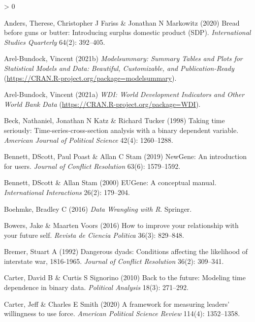 \documentclass[
  11pt,
]{article}
\newlength{\cslhangindent}
\newenvironment{CSLReferences}[2] %
 {%
  \setlength{\parindent}{0pt}
  \ifodd #1 \everypar{\setlength{\hangindent}{\cslhangindent}}\ignorespaces\fi
  \ifnum #2 > 0
  \setlength{\parskip}{#2\baselineskip}
  \fi
 }%
 {}
\begin{document}
\hypertarget{refs}{}
\begin{CSLReferences}{1}{0}
\leavevmode\hypertarget{ref-andersetal2020bbgb}{}%
Anders, Therese, Christopher J Fariss \& Jonathan N Markowitz (2020) Bread before guns or butter: Introducing surplus domestic product (SDP). \emph{International Studies Quarterly} 64(2): 392--405.

\leavevmode\hypertarget{ref-arelbundock2021m}{}%
Arel-Bundock, Vincent (2021b) \emph{Modelsummary: Summary Tables and Plots for Statistical Models and Data: Beautiful, Customizable, and Publication-Ready} (\url{https://CRAN.R-project.org/package=modelsummary}).

\leavevmode\hypertarget{ref-arelbundock2021w}{}%
Arel-Bundock, Vincent (2021a) \emph{WDI: World Development Indicators and Other World Bank Data} (\url{https://CRAN.R-project.org/package=WDI}).

\leavevmode\hypertarget{ref-becketal1998tts}{}%
Beck, Nathaniel, Jonathan N Katz \& Richard Tucker (1998) Taking time seriously: Time-series-cross-section analysis with a binary dependent variable. \emph{American Journal of Political Science} 42(4): 1260--1288.

\leavevmode\hypertarget{ref-bennettetal2019n}{}%
Bennett, DScott, Paul Poast \& Allan C Stam (2019) NewGene: An introduction for users. \emph{Journal of Conflict Resolution} 63(6): 1579--1592.

\leavevmode\hypertarget{ref-bennettstam2000e}{}%
Bennett, DScott \& Allan Stam (2000) EUGene: A conceptual manual. \emph{International Interactions} 26(2): 179--204.

\leavevmode\hypertarget{ref-boehmke2016dwr}{}%
Boehmke, Bradley C (2016) \emph{Data Wrangling with {R}}. Springer.

\leavevmode\hypertarget{ref-bowersvoors2016hiyr}{}%
Bowers, Jake \& Maarten Voors (2016) How to improve your relationship with your future self. \emph{Revista de Ciencia Politica} 36(3): 829--848.

\leavevmode\hypertarget{ref-bremer1992ddc}{}%
Bremer, Stuart A (1992) Dangerous dyads: Conditions affecting the likelihood of interstate war, 1816-1965. \emph{Journal of Conflict Resolution} 36(2): 309--341.

\leavevmode\hypertarget{ref-cartersignorino2010bf}{}%
Carter, David B \& Curtis S Signorino (2010) Back to the future: Modeling time dependence in binary data. \emph{Political Analysis} 18(3): 271--292.

\leavevmode\hypertarget{ref-cartersmith2020fml}{}%
Carter, Jeff \& Charles E Smith (2020) A framework for measuring leaders' willingness to use force. \emph{American Political Science Review} 114(4): 1352--1358.


\end{CSLReferences}
\end{document}

